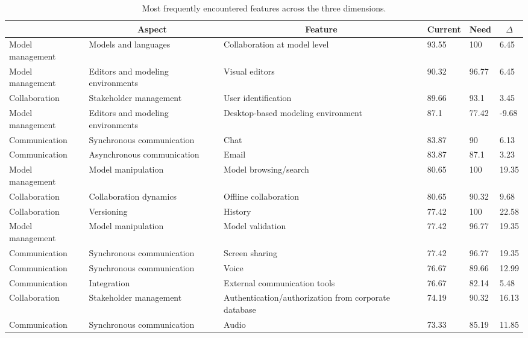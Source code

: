 
  \begin{table*}[]
  \centering
  \notsotiny
  \caption{ Most frequently encountered features across the three dimensions.}
\label{tab:most-frequent}
\begin{tabular}{|l|l|l|l|l|l|}
  \hline
  \rowcolor[HTML]{C0C0C0}
    \multicolumn{1}{|c|}{Dimension} & \multicolumn{1}{c|}{Aspect} & \multicolumn{1}{c|}{Feature} & \multicolumn{1}{c|}{Current} & \multicolumn{1}{c|}{Need} & \multicolumn{1}{c|}{$\Delta$} \\ \hline
    Model management & Models and languages & Collaboration at model level & 93.55 & 100 & 6.45 \\ \hline 
Model management & Editors and modeling environments & Visual editors & 90.32 & 96.77 & 6.45 \\ \hline 
Collaboration & Stakeholder management & User identification & 89.66 & 93.1 & 3.45 \\ \hline 
Model management & Editors and modeling environments & Desktop-based modeling environment & 87.1 & 77.42 & -9.68 \\ \hline 
Communication & Synchronous communication & Chat & 83.87 & 90 & 6.13 \\ \hline 
Communication & Asynchronous communication & Email & 83.87 & 87.1 & 3.23 \\ \hline 
Model management & Model manipulation & Model browsing/search & 80.65 & 100 & 19.35 \\ \hline 
Collaboration & Collaboration dynamics & Offline collaboration & 80.65 & 90.32 & 9.68 \\ \hline 
Collaboration & Versioning & History & 77.42 & 100 & 22.58 \\ \hline 
Model management & Model manipulation & Model validation & 77.42 & 96.77 & 19.35 \\ \hline 
Communication & Synchronous communication & Screen sharing & 77.42 & 96.77 & 19.35 \\ \hline 
Communication & Synchronous communication & Voice & 76.67 & 89.66 & 12.99 \\ \hline 
Communication & Integration & External communication tools & 76.67 & 82.14 & 5.48 \\ \hline 
Collaboration & Stakeholder management & Authentication/authorization from corporate database & 74.19 & 90.32 & 16.13 \\ \hline 
Communication & Synchronous communication & Audio & 73.33 & 85.19 & 11.85 \\ \hline 

\end{tabular}
\end{table*}
